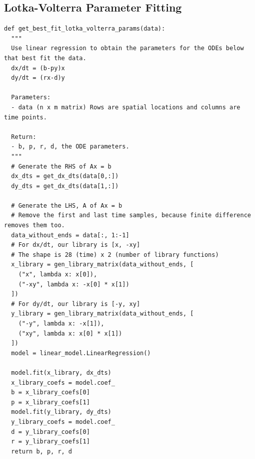 \documentclass[letterpaper, 10 pt, conference]{ieeeconf}  %
\begin{document}
\subsection*{Lotka-Volterra Parameter Fitting}
\begin{verbatim}
def get_best_fit_lotka_volterra_params(data):
  """
  Use linear regression to obtain the parameters for the ODEs below that best fit the data.
  dx/dt = (b-py)x
  dy/dt = (rx-d)y
  
  Parameters:
  - data (n x m matrix) Rows are spatial locations and columns are time points.
  
  Return:
  - b, p, r, d, the ODE parameters.
  """
  # Generate the RHS of Ax = b
  dx_dts = get_dx_dts(data[0,:])
  dy_dts = get_dx_dts(data[1,:])
  
  # Generate the LHS, A of Ax = b
  # Remove the first and last time samples, because finite difference removes them too.
  data_without_ends = data[:, 1:-1]
  # For dx/dt, our library is [x, -xy]
  # The shape is 28 (time) x 2 (number of library functions)
  x_library = gen_library_matrix(data_without_ends, [
    ("x", lambda x: x[0]),
    ("-xy", lambda x: -x[0] * x[1])
  ])
  # For dy/dt, our library is [-y, xy]
  y_library = gen_library_matrix(data_without_ends, [
    ("-y", lambda x: -x[1]),
    ("xy", lambda x: x[0] * x[1])
  ])
  model = linear_model.LinearRegression()
  
  model.fit(x_library, dx_dts)
  x_library_coefs = model.coef_
  b = x_library_coefs[0]
  p = x_library_coefs[1]
  model.fit(y_library, dy_dts)
  y_library_coefs = model.coef_
  d = y_library_coefs[0]
  r = y_library_coefs[1]
  return b, p, r, d
\end{verbatim}
\end{document}
